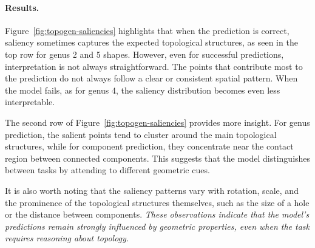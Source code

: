 \paragraph{Results.}
Figure~\ref{fig:topogen-saliencies} highlights that when the prediction is correct, saliency sometimes captures the expected topological structures, as seen in the top row for genus 2 and 5 shapes. However, even for successful predictions, interpretation is not always straightforward. The points that contribute most to the prediction do not always follow a clear or consistent spatial pattern. When the model fails, as for genus 4, the saliency distribution becomes even less interpretable.

The second row of Figure~\ref{fig:topogen-saliencies} provides more insight. For genus prediction, the salient points tend to cluster around the main topological structures, while for component prediction, they concentrate near the contact region between connected components. This suggests that the model distinguishes between tasks by attending to different geometric cues.

It is also worth noting that the saliency patterns vary with rotation, scale, and the prominence of the topological structures themselves, such as the size of a hole or the distance between components. \textit{These observations indicate that the model’s predictions remain strongly influenced by geometric properties, even when the task requires reasoning about topology.}



